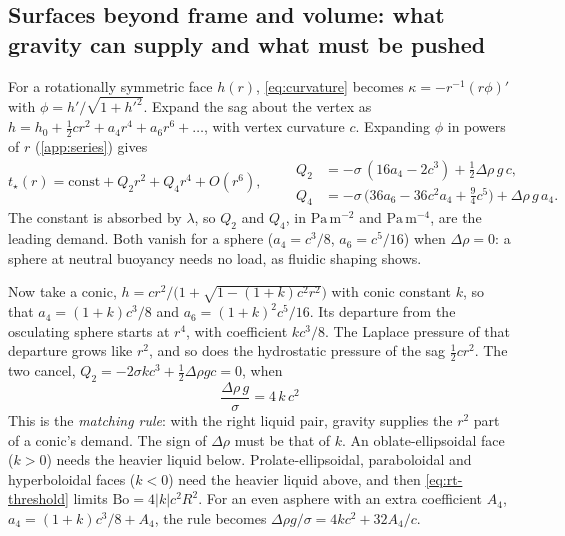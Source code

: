 \documentclass[11pt,a4paper]{article}
\numberwithin{equation}{section}
\begin{document}
\subsection{Surfaces beyond frame and volume: what gravity can supply and what must be pushed}\label{sec:series}
For a rotationally symmetric face $h(r)$, \cref{eq:curvature} becomes
$\kappa=-r^{-1}(r\phi)'$ with $\phi=h'/\sqrt{1+h'^2}$. Expand the sag about the
vertex as $h=h_0+\tfrac12cr^2+a_4r^4+a_6r^6+\dots$, with vertex curvature $c$.
Expanding $\phi$ in powers of $r$ (\cref{app:series}) gives
\begin{equation}
 t_\star(r)=\text{const}+Q_2r^2+Q_4r^4+O(r^6),\qquad
 \begin{aligned}
 Q_2&=-\sigma\,(16a_4-2c^3)+\tfrac12\Delta\rho\,g\,c,\\
 Q_4&=-\sigma\,\bigl(36a_6-36c^2a_4+\tfrac94c^5\bigr)+\Delta\rho\,g\,a_4 .
 \end{aligned}
 \label{eq:series}
\end{equation}
The constant is absorbed by $\lambda$, so $Q_2$ and $Q_4$, in
$\mathrm{Pa\,m^{-2}}$ and $\mathrm{Pa\,m^{-4}}$, are the leading demand. Both
vanish for a sphere ($a_4=c^3/8$, $a_6=c^5/16$) when $\Delta\rho=0$: a sphere at
neutral buoyancy needs no load, as fluidic shaping shows.

Now take a conic, $h=cr^2/\bigl(1+\sqrt{1-(1+k)c^2r^2}\bigr)$ with conic
constant $k$, so that $a_4=(1+k)c^3/8$ and $a_6=(1+k)^2c^5/16$. Its departure
from the osculating sphere starts at $r^4$, with coefficient $kc^3/8$. The
Laplace pressure of that departure grows like $r^2$, and so does the
hydrostatic pressure of the sag $\tfrac12cr^2$. The two cancel,
$Q_2=-2\sigma kc^3+\tfrac12\Delta\rho gc=0$, when
\begin{equation}
 \boxed{\;\frac{\Delta\rho\,g}{\sigma}=4\,k\,c^2\;}
 \label{eq:matching}
\end{equation}
This is the \emph{matching rule}: with the right liquid pair, gravity supplies
the $r^2$ part of a conic's demand. The sign of $\Delta\rho$ must be that of
$k$. An oblate-ellipsoidal face ($k>0$) needs the heavier liquid below.
Prolate-ellipsoidal, paraboloidal and hyperboloidal faces ($k<0$) need the
heavier liquid above, and then \cref{eq:rt-threshold} limits
$\mathrm{Bo}=4|k|c^2R^2$. For an even asphere with an extra coefficient $A_4$,
$a_4=(1+k)c^3/8+A_4$, the rule becomes $\Delta\rho g/\sigma=4kc^2+32A_4/c$.
\end{document}
